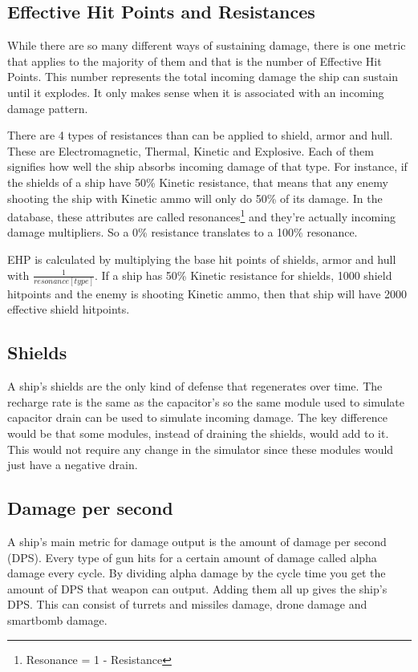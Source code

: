 \subsection{Effective Hit Points and Resistances}
While there are so many different ways of sustaining damage, there is one metric that applies to the majority of them and that is the number of Effective Hit Points. This number represents the total incoming damage the ship can sustain until it explodes. It only makes sense when it is associated with an incoming damage pattern.

There are 4 types of resistances than can be applied to shield, armor and hull. These are Electromagnetic, Thermal, Kinetic and Explosive. Each of them signifies how well the ship absorbs incoming damage of that type. For instance, if the shields of a ship have 50\% Kinetic resistance, that means that any enemy shooting the ship with Kinetic ammo will only do 50\% of its damage. In the database, these attributes are called resonances\footnote{Resonance = 1 - Resistance} and they’re actually incoming damage multipliers. So a 0\% resistance translates to a 100\% resonance.

EHP is calculated by multiplying the base hit points of shields, armor and hull with $ \frac{1}{resonance[type]} $. If a ship has 50\% Kinetic resistance for shields, 1000 shield hitpoints and the enemy is shooting Kinetic ammo, then that ship will have 2000 effective shield hitpoints.

\subsection{Shields}
A ship’s shields are the only kind of defense that regenerates over time. The recharge rate is the same as the capacitor’s so the same module used to simulate capacitor drain can be used to simulate incoming damage. The key difference would be that some modules, instead of draining the shields, would add to it. This would not require any change in the simulator since these modules would just have a negative drain.

\subsection{Damage per second}
A ship’s main metric for damage output is the amount of damage per second (DPS). Every type of gun hits for a certain amount of damage called alpha damage every cycle. By dividing alpha damage by the cycle time you get the amount of DPS that weapon can output. Adding them all up gives the ship’s DPS. This can consist of turrets and missiles damage, drone damage and smartbomb damage.

